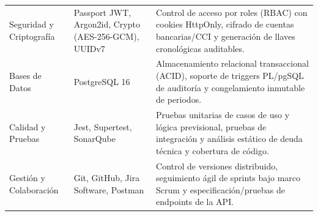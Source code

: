 \begin{minipage}{\linewidth}
\begin{tabularx}{\linewidth}{@{}p{3.2cm}p{4.6cm}X@{}}
            Seguridad y Criptografía & 
            Passport JWT, Argon2id, Crypto (AES-256-GCM), UUIDv7 & 
            Control de acceso por roles (RBAC) con cookies HttpOnly, cifrado de cuentas bancarias/CCI y generación de llaves cronológicas auditables. \\ \addlinespace
            
            Bases de Datos & 
            PostgreSQL 16 & 
            Almacenamiento relacional transaccional (ACID), soporte de triggers PL/pgSQL de auditoría y congelamiento inmutable de periodos. \\ \addlinespace
            
            Calidad y Pruebas & 
            Jest, Supertest, SonarQube & 
            Pruebas unitarias de casos de uso y lógica previsional, pruebas de integración y análisis estático de deuda técnica y cobertura de código. \\ \addlinespace
            
            Gestión y Colaboración & 
            Git, GitHub, Jira Software, Postman & 
            Control de versiones distribuido, seguimiento ágil de sprints bajo marco Scrum y especificación/pruebas de endpoints de la API. \\ \bottomrule
    \end{tabularx}
    \endgroup

\end{minipage}
\finBloqueAPA